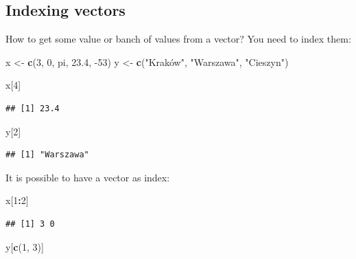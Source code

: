\documentclass[
]{book}
\newenvironment{Shaded}{\begin{snugshade}}{\end{snugshade}}
\newcommand{\DecValTok}[1]{\textcolor[rgb]{0.00,0.00,0.81}{#1}}
\newcommand{\FloatTok}[1]{\textcolor[rgb]{0.00,0.00,0.81}{#1}}
\newcommand{\KeywordTok}[1]{\textcolor[rgb]{0.13,0.29,0.53}{\textbf{#1}}}
\newcommand{\NormalTok}[1]{#1}
\newcommand{\OperatorTok}[1]{\textcolor[rgb]{0.81,0.36,0.00}{\textbf{#1}}}
\newcommand{\StringTok}[1]{\textcolor[rgb]{0.31,0.60,0.02}{#1}}
\begin{document}
\hypertarget{indexing-vectors}{%
\subsection{Indexing vectors}\label{indexing-vectors}}

How to get some value or banch of values from a vector? You need to index them:

\begin{Shaded}
\begin{Highlighting}[]
\NormalTok{x <-}\StringTok{ }\KeywordTok{c}\NormalTok{(}\DecValTok{3}\NormalTok{, }\DecValTok{0}\NormalTok{, pi, }\FloatTok{23.4}\NormalTok{, }\DecValTok{-53}\NormalTok{)}
\NormalTok{y <-}\StringTok{ }\KeywordTok{c}\NormalTok{(}\StringTok{"Kraków", "}\NormalTok{Warszawa}\StringTok{", "}\NormalTok{Cieszyn}\StringTok{")}

\StringTok{x[4]}
\end{Highlighting}
\end{Shaded}

\begin{verbatim}
## [1] 23.4
\end{verbatim}

\begin{Shaded}
\begin{Highlighting}[]
\NormalTok{y[}\DecValTok{2}\NormalTok{]}
\end{Highlighting}
\end{Shaded}

\begin{verbatim}
## [1] "Warszawa"
\end{verbatim}

It is possible to have a vector as index:

\begin{Shaded}
\begin{Highlighting}[]
\NormalTok{x[}\DecValTok{1}\OperatorTok{:}\DecValTok{2}\NormalTok{]}
\end{Highlighting}
\end{Shaded}

\begin{verbatim}
## [1] 3 0
\end{verbatim}

\begin{Shaded}
\begin{Highlighting}[]
\NormalTok{y[}\KeywordTok{c}\NormalTok{(}\DecValTok{1}\NormalTok{, }\DecValTok{3}\NormalTok{)]}
\end{Highlighting}
\end{Shaded}
\end{document}
